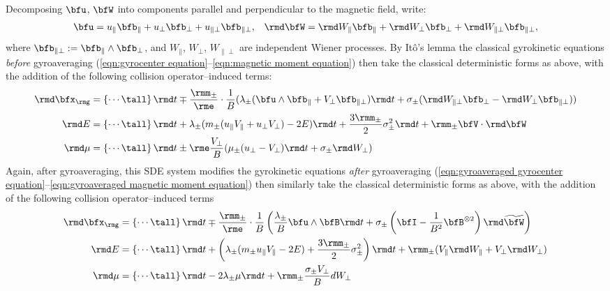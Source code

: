     Decomposing $\bfu$, $\bfW$ into components parallel and perpendicular to the magnetic field, write:
    \begin{align}
        \bfu  =  u_{\parallel}\bfb_{\parallel} + u_{\perp}\bfb_{\perp} + u_{\parallel\perp}\bfb_{\parallel\perp},  &&
        \rmd\bfW  =  \rmd W_{\parallel}\bfb_{\parallel} + \rmd W_{\perp}\bfb_{\perp} + \rmd W_{\parallel\perp}\bfb_{\parallel\perp},
    \end{align}
    where $\bfb_{\parallel\perp}  :=  \bfb_{\parallel}\wedge\bfb_{\perp}$, and $W_{\parallel}$, $W_{\perp}$, $W_{\parallel\perp}$ are independent Wiener processes. By Itô's lemma \cite{Le-Gall_2016} the classical gyrokinetic equations \emph{before} gyroaveraging (\ref{eqn:gyrocenter equation}--\ref{eqn:magnetic moment equation}) then take the classical deterministic forms as above, with the addition of the following collision operator--induced terms:
    \begin{align}
        \rmd\bfx_{\rmg}  &=  \left\{\cdots\tall\right\}\rmd t \mp \frac{\rmm_{\pm}}{\rme}\cdot\frac{1}{B}(\lambda_{\pm}(\bfu\wedge\bfb_{\parallel} + V_{\perp}\bfb_{\parallel\perp})\rmd t + \sigma_{\pm}(\rmd W_{\parallel\perp}\bfb_{\perp} - \rmd W_{\perp}\bfb_{\parallel\perp}))   \\
                 \rmd E  &=  \left\{\cdots\tall\right\}\rmd t + \lambda_{\pm}(m_{\pm}(u_{\parallel}V_{\parallel} + u_{\perp}V_{\perp}) - 2E)\rmd t + \frac{3\rmm_{\pm}}{2}\sigma_{\pm}^{2}\rmd t + \rmm_{\pm}\bfV\cdot\rmd\bfW  \\
                \rmd\mu  &=  \left\{\cdots\tall\right\}\rmd t \pm \rme\frac{V_{\perp}}{B}(\mu_{\pm}(u_{\perp} - V_{\perp})\rmd t + \sigma_{\pm}\rmd W_{\perp})
    \end{align}
    Again, after gyroaveraging, this SDE system modifies the gyrokinetic equations \emph{after} gyroaveraging (\ref{eqn:gyroaveraged gyrocenter equation}--\ref{eqn:gyroaveraged magnetic moment equation}) then similarly take the classical deterministic forms as above, with the addition of the following collision operator--induced terms
    \begin{align}
        \rmd\bfx_{\rmg}  &=  \left\{\cdots\tall\right\}\rmd t \mp \frac{\rmm_{\pm}}{\rme}\cdot\frac{1}{B}\left(\frac{\lambda_{\pm}}{B}\bfu\wedge\bfB\rmd t + \sigma_{\pm}\left(\bfI - \frac{1}{B^{2}}\bfB^{\otimes 2}\right)\rmd\widetilde{\bfW}\right)   \\
                 \rmd E  &=  \left\{\cdots\tall\right\}\rmd t + \left(\lambda_{\pm}(m_{\pm}u_{\parallel}V_{\parallel} - 2E) + \frac{3\rmm_{\pm}}{2}\sigma_{\pm}^{2}\right)\rmd t + \rmm_{\pm}(V_{\parallel}\rmd W_{\parallel} + V_{\perp}\rmd W_{\perp})  \\
                \rmd\mu  &=  \left\{\cdots\tall\right\}\rmd t - 2\lambda_{\pm}\mu\rmd t + \rmm_{\pm}\frac{\sigma_{\pm}V_{\perp}}{B}dW_{\perp}
    \end{align}
